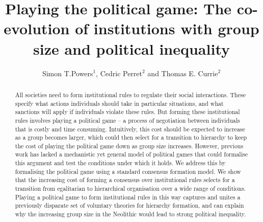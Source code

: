 \documentclass{rstb}
\begin{document}
\title{Playing the political game: The co-evolution of institutions with group size and political inequality}
\author{Simon T.Powers$^{1}$, Cedric Perret$^{2}$ and Thomas E. Currie$^{2}$}
\address{$^{1}$Edinburgh Napier University, Edinburgh EH10 5DT\\ 
$^{2}$University of Exeter, Penryn TR10 9FE}
\subject{}
\begin{abstract}

\noindent All societies need to form institutional rules to regulate their social interactions. These specify what actions individuals should take in particular situations, and what sanctions will apply if individuals violate these rules. But forming these institutional rules involves playing a political game -- a process of negotiation between individuals that is costly and time consuming. Intuitively, this cost should be expected to increase as a group becomes larger, which could then select for a transition to hierarchy to keep the cost of playing the political game down as group size increases. However, previous work has lacked a mechanistic yet general model of political games that could formalise this argument and test the conditions under which it holds. We address this by formalising the political game using a standard consensus formation model. We show that the increasing cost of forming a consensus over institutional rules selects for a transition from egalitarian to hierarchical organisation over a wide range of conditions. Playing a political game to form institutional rules in this way captures and unites a previously disparate set of voluntary theories for hierarchy formation, and can explain why the increasing group size in the Neolithic would lead to strong political inequality.
\end{abstract}

\rsbreak
\end{document}
